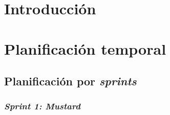 
\section{Introducción}

\section{Planificación temporal}

\subsection{Planificación por \textit{sprints}}


\subsubsection{\textit{Sprint 1: Mustard}}


